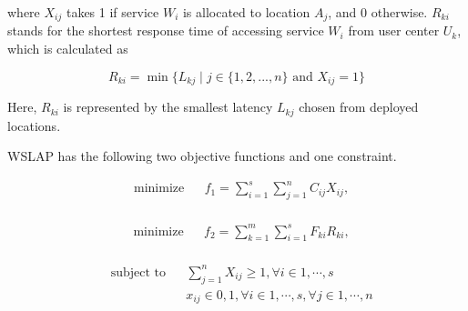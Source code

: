\documentclass[10pt,journal,compsoc]{IEEEtran}
\begin{document}
\noindent where $X_{ij}$ takes 1 if service $W_i$ is allocated to location $A_j$, and 0 otherwise. $R_{ki}$ stands for the shortest response time of accessing service $W_i$ from user center $U_k$, which is calculated as
\begin{small}
 \begin{equation}
 \label{eq:response}
  R_{ki} = \min\{L_{kj} \mid j \in \{1, 2, ..., n\} \text{ and } X_{ij} = 1\}
 \end{equation}
 \end{small}

Here, $R_{ki}$ is represented by the smallest latency $L_{kj}$ chosen from deployed locations.

WSLAP has the following two objective functions and one constraint.

\begin{small}
\begin{equation} \label{eq:cost}
\begin{aligned}
& {\text{minimize}}
& &  f_1 = \sum\limits_{i=1}^s \sum\limits_{j = 1}^n C_{ij} X_{ij},\\
\end{aligned}
\end{equation}

\begin{equation}
\begin{aligned} \label{eq:latency}
& {\text{minimize}}
& & f_2 = \sum\limits_{k=1}^m \sum\limits_{i=1}^s F_{ki} R_{ki},\\
\end{aligned}
\end{equation}

\begin{equation} \label{eq:constraint}
\begin{aligned}
& \text{subject to}
& &  \sum_{j=1}^n X_{ij} \geqslant 1, \forall i \in {1, \cdots, s}\\
& & & x_{ij} \in {0, 1}, \forall i \in {1, \cdots, s}, \forall j \in {1, \cdots, n}
\end{aligned}
\end{equation}
\end{small}

\end{document}
